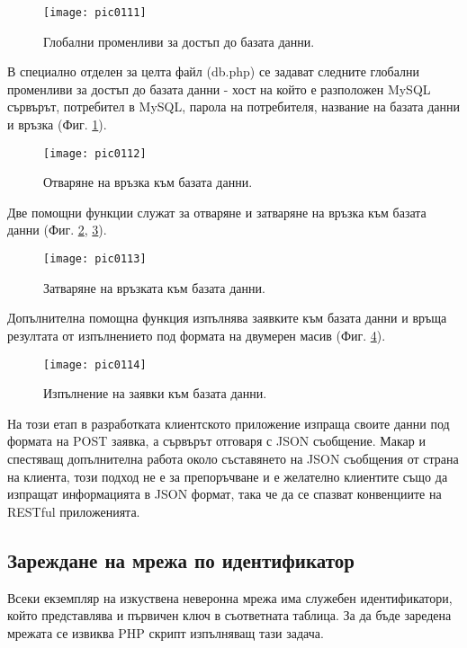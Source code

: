 \begin{figure}[h]
  \centering
  \texttt{[image: pic0111]}
  \caption{Глобални променливи за достъп до базата данни.}
\label{fig:pic0111}
\end{figure}
\FloatBarrier

В специално отделен за целта файл (db.php) се задават следните глобални променливи за достъп до базата данни - хост на който е разположен MySQL сървърът, потребител в MySQL, парола на потребителя, название на базата данни и връзка (Фиг. \ref{fig:pic0111}).

\begin{figure}[h]
  \centering
  \texttt{[image: pic0112]}
  \caption{Отваряне на връзка към базата данни.}
\label{fig:pic0112}
\end{figure}
\FloatBarrier

Две помощни функции служат за отваряне и затваряне на връзка към базата данни (Фиг. \ref{fig:pic0112}, \ref{fig:pic0113}).

\begin{figure}[h]
  \centering
  \texttt{[image: pic0113]}
  \caption{Затваряне на връзката към базата данни.}
\label{fig:pic0113}
\end{figure}
\FloatBarrier

Допълнителна помощна функция изпълнява заявките към базата данни и връща резултата от изпълнението под формата на двумерен масив (Фиг. \ref{fig:pic0114}).

\begin{figure}[h]
  \centering
  \texttt{[image: pic0114]}
  \caption{Изпълнение на заявки към базата данни.}
\label{fig:pic0114}
\end{figure}
\FloatBarrier

На този етап в разработката клиентското приложение изпраща своите данни под формата на POST заявка, а сървърът отговаря с JSON съобщение. Макар и спестяващ допълнителна работа около съставянето на JSON съобщения от страна на клиента, този подход не е за препоръчване и е желателно клиентите също да изпращат информацията в JSON формат, така че да се спазват конвенциите на RESTful приложенията. 

\subsection{Зареждане на мрежа по идентификатор}

Всеки екземпляр на изкуствена неверонна мрежа има служебен идентификатори, който представлява и първичен ключ в съответната таблица. За да бъде заредена мрежата се извиква PHP скрипт изпълняващ тази задача. 

